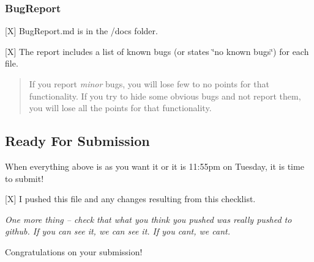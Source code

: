 \subsubsection*{Bug\+Report}


\begin{DoxyItemize}
\item \mbox{[}X\mbox{]} Bug\+Report.\+md is in the /docs folder.
\item \mbox{[}X\mbox{]} The report includes a list of known bugs (or states \char`\"{}no known bugs\char`\"{}) for each file. \begin{quote}
If you report {\itshape minor} bugs, you will lose few to no points for that functionality. If you try to hide some obvious bugs and not report them, you will lose all the points for that functionality. \end{quote}

\end{DoxyItemize}

\subsection*{Ready For Submission}

When everything above is as you want it or it is 11\+:55pm on Tuesday, it is time to submit!


\begin{DoxyItemize}
\item \mbox{[}X\mbox{]} I pushed this file and any changes resulting from this checklist.
\end{DoxyItemize}

{\itshape One more thing -- check that what you think you pushed was really pushed to github. If you can see it, we can see it. If you can\textquotesingle{}t, we can\textquotesingle{}t.}

Congratulations on your submission! 